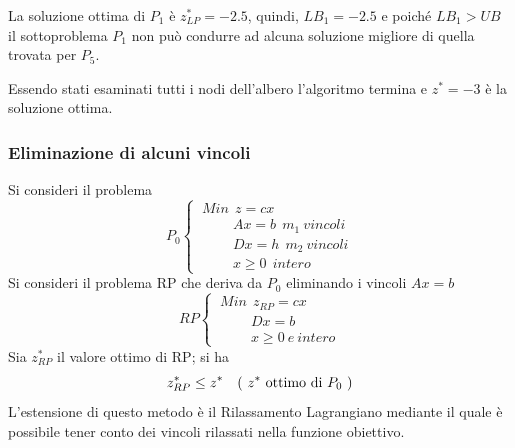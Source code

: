 La soluzione ottima di $P_{1}$ è $z_{LP}^{*}=-2.5$, quindi, $LB_{1}=-2.5$ e poiché $LB_{1}>UB$ il sottoproblema $P_{1}$ non può condurre ad alcuna soluzione migliore di quella trovata per $P_{5}$.

Essendo stati esaminati tutti i nodi dell'albero l'algoritmo termina e $z^{*}=-3$ è la soluzione ottima.

\subsubsection{Eliminazione di alcuni vincoli}
Si consideri il problema
\begin{displaymath}
P_{0}
\begin{cases}
\ Min\ \ z=cx\\
\ \ \ \ \ \ \ \ \ \ \ A x = b\ \ m_{1}\ vincoli\\
\ \ \ \ \ \ \ \ \ \ \ Dx=h\ \ m_{2}\ vincoli\\
\ \ \ \ \ \ \ \ \ \ \ x\ge 0\ \ intero
\end{cases}
\end{displaymath}
Si consideri il problema RP che deriva da $P_{0}$ eliminando i vincoli $Ax=b$
\begin{displaymath}
RP
\begin{cases}
\ Min\ \ z_{RP}=cx\\
\ \ \ \ \ \ \ \ \ \ \ Dx=b\\
\ \ \ \ \ \ \ \ \ \ \ x \ge 0\ e\:intero
\end{cases}
\end{displaymath}
Sia $z_{RP}^{*}$ il valore ottimo di RP; si ha
\begin{equation*}
	z_{RP}^{*}\le z^{*} \ \ \ (\ z^{*}\textnormal{ ottimo di } P_{0}\ )
\end{equation*}
L'estensione di questo metodo è il Rilassamento Lagrangiano mediante il quale è possibile tener conto dei vincoli rilassati nella funzione obiettivo.

